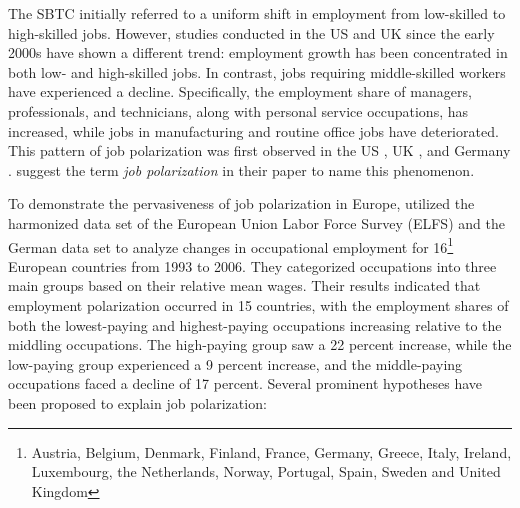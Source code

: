 \begin{onehalfspace}
The SBTC initially referred to a uniform shift in employment from
low-skilled to high-skilled jobs. However, studies conducted in the
US and UK since the early 2000s have shown a different trend: employment
growth has been concentrated in both low- and high-skilled jobs. In
contrast, jobs requiring middle-skilled workers have experienced a
decline. Specifically, the employment share of managers, professionals,
and technicians, along with personal service occupations, has increased,
while jobs in manufacturing and routine office jobs have deteriorated.
This pattern of job polarization was first observed in the US \citep{2006Autor},
UK \citep{2007Goos}, and Germany \citep{2006SpitzOener,2009Dustmann}.
\citet{2007Goos} suggest the term \emph{job polarization }in their
paper to name this phenomenon.

To demonstrate the pervasiveness of job polarization in Europe, \citet{2009Goos}
utilized the harmonized data set of the European Union Labor Force
Survey (ELFS) and the German data set to analyze changes in occupational
employment for 16\footnote{Austria, Belgium, Denmark, Finland, France, Germany, Greece, Italy,
Ireland, Luxembourg, the Netherlands, Norway, Portugal, Spain, Sweden
and United Kingdom} European countries from 1993 to 2006. They categorized occupations
into three main groups based on their relative mean wages. Their results
indicated that employment polarization occurred in 15 countries, with
the employment shares of both the lowest-paying and highest-paying
occupations increasing relative to the middling occupations. The high-paying
group saw a 22 percent increase, while the low-paying group experienced
a 9 percent increase, and the middle-paying occupations faced a decline
of 17 percent. Several prominent hypotheses have been proposed to
explain job polarization:
\end{onehalfspace}
